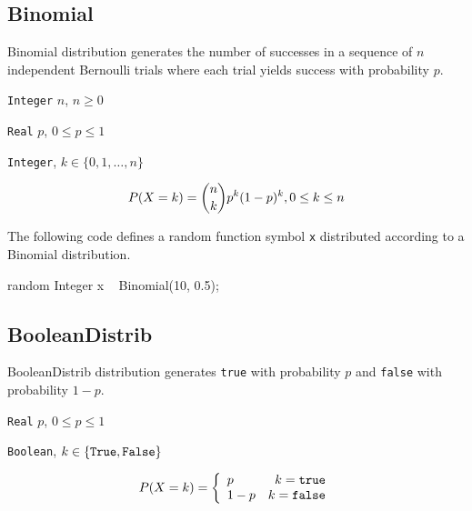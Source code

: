 \subsection{Binomial}
Binomial distribution generates the number of successes in a sequence of $n$ independent Bernoulli trials where each trial yields success with probability $p$.

\begin{itemize*}
\item[] \verb|Integer| $n$, $n \geq 0$
\item[] \verb|Real| $p$, $0 \leq p \leq 1$
\end{itemize*}

\begin{itemize*}
\item[] \verb|Integer|, $k \in \{0, 1, \ldots, n\} $
\end{itemize*}

\[
	P(X = k) = \binom{n}{k}p^{k}(1-p)^{k} , 0 \leq k \leq n \\
\]

The following code defines a random function symbol \verb|x| distributed according to a Binomial distribution.
\begin{blogcode}
random Integer x ~ Binomial(10, 0.5);
\end{blogcode}

\subsection{BooleanDistrib} \label{boolean-distribution-section}
BooleanDistrib distribution generates \verb|true| with probability $p$ and \verb|false| with probability $1-p$. 

\begin{itemize*}
\item[] \verb|Real|
 $p$, $0 \leq p \leq 1$ 
\end{itemize*}

\begin{itemize*}
\item[] \verb|Boolean|, $k \in \{\verb|True|, \verb|False|\}$ 
\end{itemize*}

\[
	P(X = k) = \left\{
	  \begin{array}{lr}
	    p & k = \verb|true| \\
	    1 - p & k = \verb|false|
	  \end{array}
	\right.
\]

